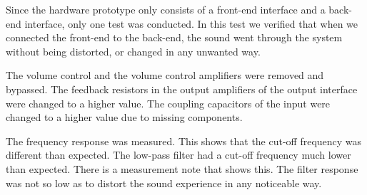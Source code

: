 Since the hardware prototype only consists of a front-end interface and a back-end interface, only one test was conducted. In this test we verified that when we connected the front-end to the back-end, the sound went through the system without being distorted, or changed in any unwanted way.

The volume control and the volume control amplifiers were removed and bypassed. The feedback resistors in the output amplifiers of the output interface were changed to a higher value. The coupling capacitors of the input were changed to a higher value due to missing components. 

The frequency response was measured. This shows that the cut-off frequency was different than expected. The low-pass filter had a cut-off frequency much lower than expected. There is a measurement note that shows this. The filter response was not so low as to distort the sound experience in any noticeable way.


